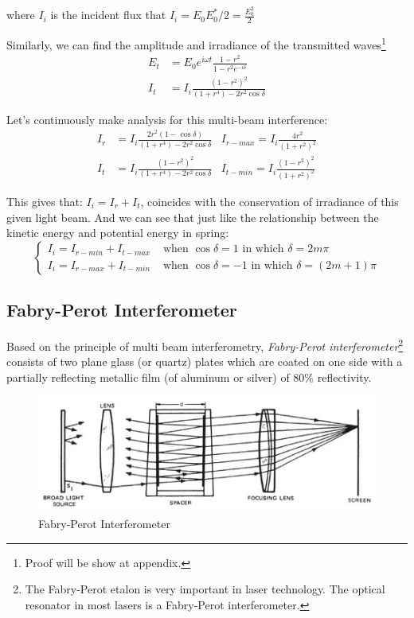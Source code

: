 \documentclass[openany]{book}
\begin{document}
where $I_i$ is the incident flux that $I_i=E_0E_0^*/2=\frac{E_0^2}{2}$

Similarly, we can find the amplitude and irradiance of the transmitted waves\footnote{Proof will be show at appendix.}
\begin{align*}
E_t&=E_0e^{i\omega t}\frac{1-r^2}{1-r^2e^{-i\delta }}\\
I_t&=I_i\frac{(1-r^2)^2}{(1+r^4)-2r^2\cos \delta}
\end{align*}

Let's continuously make analysis for this multi-beam interference:
\begin{align*}
I_r&=I_i\frac{2r^2(1-\cos \delta)}{(1+r^4)-2r^2\cos \delta}&I_{r-max}=I_i\frac{4r^2}{(1+r^2)^2}\\
I_t&=I_i\frac{(1-r^2)^2}{(1+r^4)-2r^2\cos \delta}&I_{t-min}=I_i\frac{(1-r^2)^2}{(1+r^2)^2}
\end{align*}

This gives that: $I_i=I_r+I_t$, coincides with the conservation of irradiance of this given light beam. And we can see that just like the relationship between the kinetic energy and potential energy in spring:
\[\begin{cases}
I_i=I_{r-min}+I_{t-max} &\textrm{ when }\cos \delta =1\textrm{ in which }\delta =2m\pi\\
I_i=I_{r-max}+I_{t-min} &\textrm{ when }\cos \delta =-1\textrm{ in which }\delta =(2m+1)\pi 
\end{cases}\]

\subsection{Fabry-Perot Interferometer}
Based on the principle of multi beam interferometry, \emph{Fabry-Perot interferometer}\footnote{The Fabry-Perot etalon is very important in laser technology. The optical resonator in most lasers is a Fabry-Perot interferometer.} consists of two plane glass (or quartz) plates which are coated on one side with a partially reflecting metallic film (of aluminum or silver) of $80\%$ reflectivity.
\begin{figure}[H]
\centering
\label{fig:Fabry-Perot Interferometer}
\includegraphics[scale=0.8]{Figure/FIG2.JPG}
\caption{Fabry-Perot Interferometer}
\end{figure}
\end{document}
